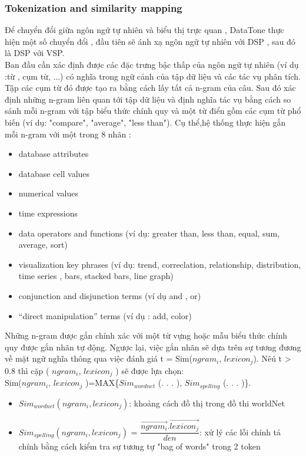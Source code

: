\documentclass[12pt]{report}
\begin{document}
\subsubsection{Tokenization and similarity mapping}
Để chuyển đổi giữa ngôn ngữ tự nhiên và biểu thị trực quan , DataTone thực hiện một số chuyển đổi , đầu tiên sẽ ánh xạ ngôn ngữ tự nhiên với DSP , sau đó là DSP với VSP. \\
Ban đầu cần xác định được các đặc trưng bậc thấp của ngôn ngữ tự nhiên (ví dụ :từ , cụm từ, ...) có nghĩa trong ngữ cảnh của tập dữ liệu và các tác vụ phân tích. Tập các cụm từ đó được tạo ra bằng cách lấy tất cả n-gram của câu. Sau đó xác định những n-gram liên quan tới tập dữ liệu và định nghĩa tác vụ bằng cách so sánh mỗi n-gram với tập biểu thức chính quy và một từ điển gồm các cụm từ phổ biến (ví dụ: "compare", "average", "less than"). Cụ thể,hệ thống thực hiện gắn mỗi n-gram với một trong 8 nhãn :
\begin{itemize}
	\item database attributes
	\item database cell values
	\item numerical values
	\item time expressions
	\item data operators and functions (ví dụ: greater than, less than, equal, sum, average, sort)
	\item visualization key phrases (ví dụ: trend, correclation, relationship, distribution, time series , bars, stacked bars, line graph)
	\item conjunction and disjunction terms (ví dụ and , or)
	\item “direct manipulation” terms (ví dụ : add, color)
\end{itemize}
Những n-gram được gắn chính xác với một từ vựng hoặc mẫu biểu thức chính quy được gắn nhãn tự động. Ngược lại, việc gắn nhãn sẽ dựa trên sự tương đương về mặt ngữ nghĩa thông qua việc đánh giá  t = Sim($ngram_{i}$, $lexicon_{j}$). Nêú t > 0.8 thì cặp ( $ngram_{i}$, $lexicon_{j}$ ) sẽ được lựa chọn: \\
Sim($ngram_{i}$, $lexicon_{j}$ )=MAX\{$Sim_{wordnet}$ (. . . ), $Sim_{spelling}$ (. . . )\}.
\begin{itemize}
	\item $Sim_{wordnet}(ngram_{i}, lexicon_{j})$: khoảng cách đồ thị trong đồ thi worldNet
	\item $Sim_{spelling}(ngram_{i}, lexicon_{j})$ = $\dfrac{\vec{ngram_{i}}.\vec{lexicon_{j}}}{den}$: xử lý các lỗi chính tả chính bằng cách kiểm tra sự tương tự "bag of words" trong 2 token
\end{itemize}
\end{document}
